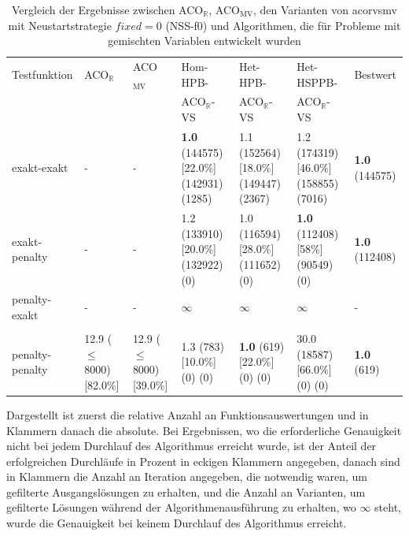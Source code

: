 \documentclass[fontsize=12, a4aper]{scrartcl}
\begin{document}
	\begin{table}[H]
		
		\caption{Vergleich der Ergebnisse zwischen ACO\(_\mathbb{R}\), ACO\(_\text{MV}\), den Varianten von \acl{acorvsmv} mit Neustartstrategie \(fixed = 0\) (NSS-f0) und Algorithmen, die für Probleme mit gemischten Variablen entwickelt wurden}
		
		\label{subsubsec:Vergleich_Von_ACO_R_ACO_R_Very_Simple_Und_Iterationen:tab:Vergleich_CSD_fixed}
		
		\scriptsize
		
		\begin{tabularx}{\linewidth}{l X X X X X X}
			
			\toprule
			
			Testfunktion & ACO\(_\mathbb{R}\) & ACO\(_{\text{MV}}\) & Hom-HPB- & Het-HPB- & Het-HSPPB- & Bestwert\\
						 & 					  &						& ACO\(_\mathbb{R}\)-VS & ACO\(_\mathbb{R}\)-VS & ACO\(_\mathbb{R}\)-VS & \\
			
			\midrule
			
			exakt-exakt & - & - & \textbf{1.0} (144575) [22.0\%] (142931) (1285) & 1.1 (152564) [18.0\%] (149447) (2367) & 1.2 (174319) [46.0\%] (158855) (7016) & \textbf{1.0} (144575)\\

			exakt-penalty & - & - & 1.2 (133910) [20.0\%] (132922) (0) & 1.0 (116594) [28.0\%] (111652) (0) & \textbf{1.0} (112408) [58\%] (90549) (0) & \textbf{1.0} (112408)\\
			
			penalty-exakt & - & - & \(\infty\) & \(\infty\) & \(\infty\) & - \\
			
			 & & & & & & \\
			
			penalty-penalty & 12.9 (\(\leq\)8000) [82.0\%] & 12.9 (\(\leq\)8000) [39.0\%] & 1.3 (783) [10.0\%] (0) (0) & \textbf{1.0} (619) [22.0\%] (0) (0) & 30.0 (18587) [66.0\%] (0) (0) & \textbf{1.0} (619)\\
			
			\bottomrule
			
		\end{tabularx}
		
		\smallskip
		
		Dargestellt ist zuerst die relative Anzahl an Funktionsauswertungen und in Klammern danach die absolute. Bei Ergebnissen, wo die erforderliche Genauigkeit nicht bei jedem Durchlauf des Algorithmus erreicht wurde, ist der Anteil der erfolgreichen Durchläufe in Prozent in eckigen Klammern angegeben, danach sind in Klammern die Anzahl an Iteration angegeben, die notwendig waren, um gefilterte Ausgangslösungen zu erhalten, und die Anzahl an Varianten, um gefilterte Lösungen während der Algorithmenausführung zu erhalten, wo \(\infty\) steht, wurde die Genauigkeit bei keinem Durchlauf des Algorithmus erreicht.\hfill\newline
		
	\end{table}
	
\end{document}
